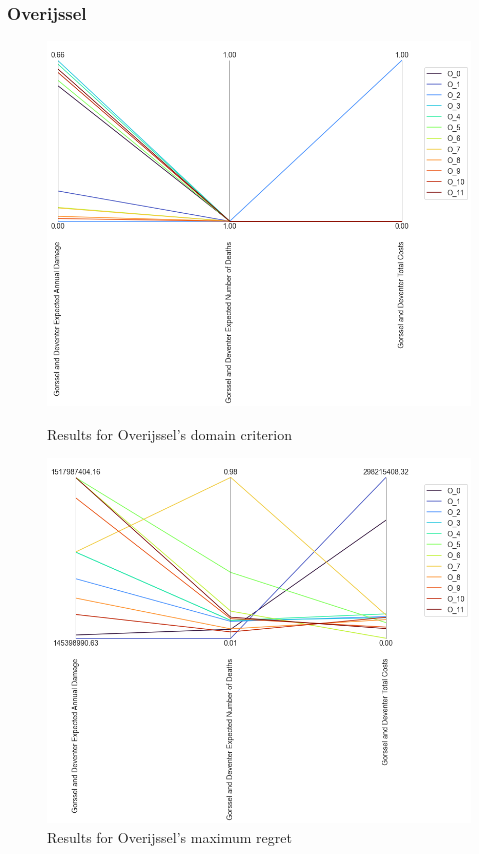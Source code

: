 \subsubsection{Overijssel}

\begin{figure}[H]
  \centering
  \begin{minipage}[b]{0.4\textwidth}
    \includegraphics[width=1.15\textwidth]{report/figures/results/domain_criterion_Overijssel.png}
    \caption{Results for Overijssel's domain criterion}
    \label{fig:domain_criterion_Overijssels}
  \end{minipage}
  \hfill
  \begin{minipage}[b]{0.4\textwidth}
    \includegraphics[width=1.15\textwidth]{report/figures/results/regret_figure_Overijssel.png}
    \caption{Results for Overijssel's maximum regret}
    \label{fig:regret_Overijssels}
  \end{minipage}
\end{figure}

